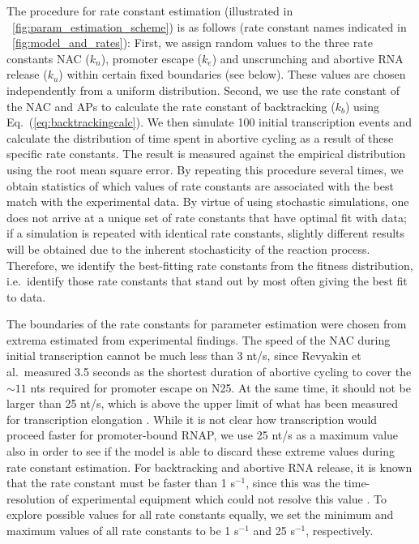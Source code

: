 The procedure for rate constant estimation (illustrated in
\FIG~\ref{fig:param_estimation_scheme}) is as follows (rate constant names
indicated in \FIG~\ref{fig:model_and_rates}): First, we assign random values
to the three rate constants NAC ($k_n$), promoter escape ($k_e$) and
unscrunching and abortive RNA release ($k_u$) within certain fixed boundaries
(see below). These values are chosen independently from a uniform
distribution. Second, we use the rate constant of the NAC and APs to
calculate the rate constant of backtracking ($k_b$) using
Eq.~(\ref{eq:backtrackingcalc}). We then simulate 100 initial transcription
events and calculate the distribution of time spent in abortive cycling as a
result of these specific rate constants. The result is measured against the
empirical distribution \cite{revyakin_abortive_2006} using the root mean
square error. By repeating this procedure several times, we obtain statistics
of which values of rate constants are associated with the best match with
the experimental data. By virtue of using stochastic simulations, one does not
arrive at a unique set of rate constants that have optimal fit with data; if a
simulation is repeated with identical rate constants, slightly different
results will be obtained due to the inherent stochasticity of the reaction
process. Therefore, we identify the best-fitting rate constants from the
fitness distribution, i.e.\ identify those rate constants that stand out
by most often giving the best fit to data.

The boundaries of the rate constants for parameter estimation were chosen from
extrema estimated from experimental findings. The speed of the NAC during initial
transcription cannot be much less than 3 nt/s, since Revyakin et al.\ measured
3.5 seconds as the shortest duration of abortive cycling
\cite{revyakin_abortive_2006} to cover the $\sim 11$ nts required for promoter
escape on N25. At the same time, it should not be larger than 25 nt/s,
which is above the upper limit of what has been measured for transcription
elongation \cite{bai_mechanochemical_2007}. While it is not clear how
transcription would proceed faster for promoter-bound RNAP, we use 25 nt/s as
a maximum value also in order to see if the model is able to discard these
extreme values during rate constant estimation. For backtracking and abortive
RNA release, it is known that the rate constant must be faster than 1
s$^{-1}$, since this was the time-resolution of experimental equipment which
could not resolve this value \cite{revyakin_abortive_2006}. To explore
possible values for all rate constants equally, we set the minimum and maximum
values of all rate constants to be 1 s$^{-1}$ and 25 s$^{-1}$, respectively. 

